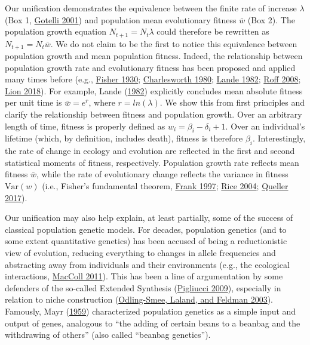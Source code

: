 \documentclass[
]{article}
\begin{document}
Our unification demonstrates the equivalence between the finite rate of
increase \(\lambda\) (Box 1, \protect\hyperlink{ref-Gotelli2001}{Gotelli
2001}) and population mean evolutionary fitness \(\bar{w}\) (Box 2). The
population growth equation \(N_{t+1} = N_{t}\lambda\) could therefore be
rewritten as \(N_{t+1} = N_{t}\bar{w}\). We do not claim to be the first
to notice this equivalence between population growth and mean population
fitness. Indeed, the relationship between population growth rate and
evolutionary fitness has been proposed and applied many times before
(e.g., \protect\hyperlink{ref-Fisher1930}{Fisher 1930};
\protect\hyperlink{ref-Charlesworth1980}{Charlesworth 1980};
\protect\hyperlink{ref-Lande1982}{Lande 1982};
\protect\hyperlink{ref-Roff2008}{Roff 2008};
\protect\hyperlink{ref-Lion2018}{Lion 2018}). For example, Lande
(\protect\hyperlink{ref-Lande1982}{1982}) explicitly concludes mean
absolute fitness per unit time is \(\bar{w} = e^{r}\), where
\(r = ln(\lambda)\). We show this from first principles and clarify the
relationship between fitness and population growth. Over an arbitrary
length of time, fitness is properly defined as
\(w_{i} = \beta_{i} - \delta_{i} + 1\). Over an individual's lifetime
(which, by definition, includes death), fitness is therefore
\(\beta_{i}\). Interestingly, the rate of change in ecology and
evolution are reflected in the first and second statistical moments of
fitness, respectively. Population growth rate reflects mean fitness
\(\bar{w}\), while the rate of evolutionary change reflects the variance
in fitness \(\mathrm{Var}(w)\) (i.e., Fisher's fundamental theorem,
\protect\hyperlink{ref-Frank1997}{Frank 1997};
\protect\hyperlink{ref-Rice2004}{Rice 2004};
\protect\hyperlink{ref-Queller2017}{Queller 2017}).

Our unification may also help explain, at least partially, some of the
success of classical population genetic models. For decades, population
genetics (and to some extent quantitative genetics) has been accused of
being a reductionistic view of evolution, reducing everything to changes
in allele frequencies and abstracting away from individuals and their
environments (e.g., the ecological interactions,
\protect\hyperlink{ref-MacColl2011}{MacColl 2011}). This has been a line
of argumentation by some defenders of the so-called Extended Synthesis
(\protect\hyperlink{ref-Pigliucci2009}{Pigliucci 2009}), especially in
relation to niche construction
(\protect\hyperlink{ref-Odling-smee2003}{Odling-Smee, Laland, and
Feldman 2003}). Famously, Mayr (\protect\hyperlink{ref-Mayr1960}{1959})
characterized population genetics as a simple input and output of genes,
analogous to ``the adding of certain beans to a beanbag and the
withdrawing of others'' (also called ``beanbag genetics'').
\end{document}
